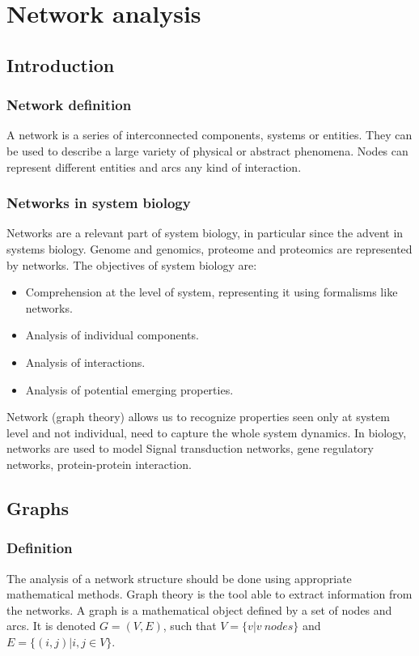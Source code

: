 \graphicspath{{chapters/07/images/}}
\chapter{Network analysis}

\section{Introduction}

	\subsection{Network definition}
	A network is a series of interconnected components, systems or entities.
	They can be used to describe a large variety of physical or abstract phenomena.
	Nodes can represent different entities and arcs any kind of interaction.

	\subsection{Networks in system biology}
	Networks are a relevant part of system biology, in particular since the advent in systems biology. Genome and genomics, proteome and proteomics are represented by networks.
	The objectives of system biology are:

		\begin{itemize}
			\item Comprehension at the level of system, representing it using formalisms like networks.
			\item Analysis of individual components.
			\item Analysis of interactions.
			\item Analysis of potential emerging properties.
		\end{itemize}

Network (graph theory) allows us to recognize properties seen only at system level and not individual, need to capture the whole system dynamics.
In biology, networks are used to model Signal transduction networks, gene regulatory networks, protein-protein interaction.

\section{Graphs}

	\subsection{Definition}
	The analysis of a network structure should be done using appropriate mathematical methods.
	Graph theory is the tool able to extract information from the networks.
	A graph is a mathematical object defined by a set of nodes and arcs.
	It is denoted $G = (V, E)$, such that $V = \{v|v\ nodes\}$ and $E = \{(i,j)|i,j\in V\}$.

